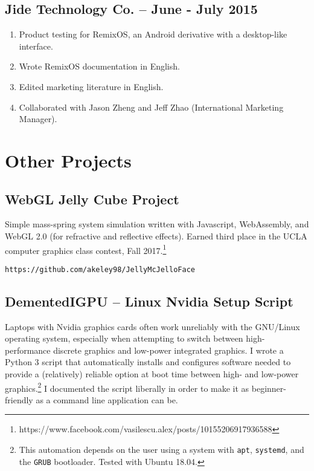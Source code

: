 \documentclass[11pt]{article}
\begin{document}
\subsection{Jide Technology Co. -- June - July 2015}
\begin{enumerate}
\item Product testing for RemixOS, an Android derivative with a
  desktop-like interface.

\item Wrote RemixOS documentation in English.

\item Edited marketing literature in English.

\item Collaborated with Jason Zheng and Jeff Zhao (International
  Marketing Manager).
\end{enumerate}

\section{Other Projects}

\subsection{WebGL Jelly Cube Project}

Simple mass-spring system simulation written with Javascript,
WebAssembly, and WebGL 2.0 (for refractive and reflective effects).
Earned third place in the UCLA computer graphics class contest, Fall
2017.\footnote{
  https://www.facebook.com/vasilescu.alex/posts/10155206917936588}

\texttt{https://github.com/akeley98/JellyMcJelloFace}

\subsection{DementedIGPU -- Linux Nvidia Setup Script}

Laptops with Nvidia graphics cards often work unreliably with the
GNU/Linux operating system, especially when attempting to switch
between high-performance discrete graphics and low-power integrated
graphics. I wrote a Python 3 script that automatically installs and
configures software needed to provide a (relatively) reliable option
at boot time between high- and low-power graphics.\footnote{This
  automation depends on the user using a system with \texttt{apt},
  \texttt{systemd}, and the \texttt{GRUB} bootloader. Tested with
  Ubuntu 18.04.} I documented the script liberally in order to make it
as beginner-friendly as a command line application can be.
\end{document}
